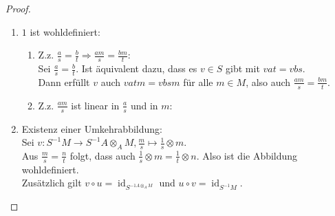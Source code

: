 \documentclass[10pt,a4paper]{article}
\newcommand{\id}{\operatorname{id}}
\theoremstyle{definition}
\theoremstyle{plain}
\theoremstyle{remark}
\begin{document}
\begin{proof}
	\begin{enumerate}
		\item $1$ ist wohldefiniert:
		\begin{enumerate}
			\item Z.z. $\frac{a}{s}=\frac{b}{t}\Rightarrow \frac{am}{s}=\frac{bm}{t}$:\\
			Sei $\frac{a}{s}=\frac{b}{t}$. Ist äquivalent dazu, dass es $v\in S$ gibt mit $vat=vbs$.\\
			Dann erfüllt $v$ auch $vatm=vbsm$ für alle $m\in M$, also auch $\frac{am}{s}=\frac{bm}{t}$.
			\item Z.z. $\frac{am}{s}$ ist linear in $\frac{a}{s}$ und in $m$:
		\end{enumerate}
		\item Existenz einer Umkehrabbildung:\\
		Sei $v:S^{-1}M\rightarrow S^{-1}A\otimes_A M, \frac{m}{s}\mapsto\frac{1}{s}\otimes m$.\\
		Aus $\frac{m}{s}=\frac{n}{t}$ folgt, dass auch $\frac{1}{s}\otimes m=\frac{1}{t}\otimes n$. Also ist die Abbildung wohldefiniert.\\
		Zusätzlich gilt $v\circ u=\id_{S^{-1A\otimes_A M}}$ und $u\circ v=\id_{S^{-1}M}$.
	\end{enumerate}
\end{proof}
\end{document}
